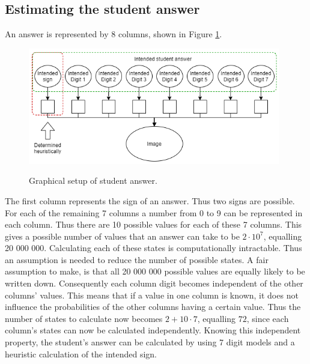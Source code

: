 \subsection{Estimating the student answer}
\label{sec:studentAnswer}

An answer is represented by 8 columns, shown in Figure \ref{fig:stdAns}. \begin{figure}[b]
  \centering
  \includegraphics[width=11cm]{ans}\\
  \caption{Graphical setup of student answer.}
  \label{fig:stdAns}
\end{figure}The first column represents the sign of an answer. Thus two signs are possible. For each of the remaining 7 columns a number from 0 to 9 can be represented in each column. Thus there are 10 possible values for each of these 7 columns. This gives a possible number of values that an answer can take to be $2\cdot 10^7$, equalling 20 000 000. Calculating each of these states is computationally intractable. Thus an assumption is needed to reduce the number of possible states. A fair assumption to make, is that all 20 000 000 possible values are equally likely to be written down. Consequently each column digit becomes independent of the other columns' values. This means that if a value in one column is known, it does not influence the probabilities of the other columns having a certain value. Thus the number of states to calculate now becomes $2+10\cdot 7$, equalling $72$, since each column's states can now be calculated independently. Knowing this independent property, the student's answer can be calculated by using 7 digit models and a heuristic calculation of the intended sign.



